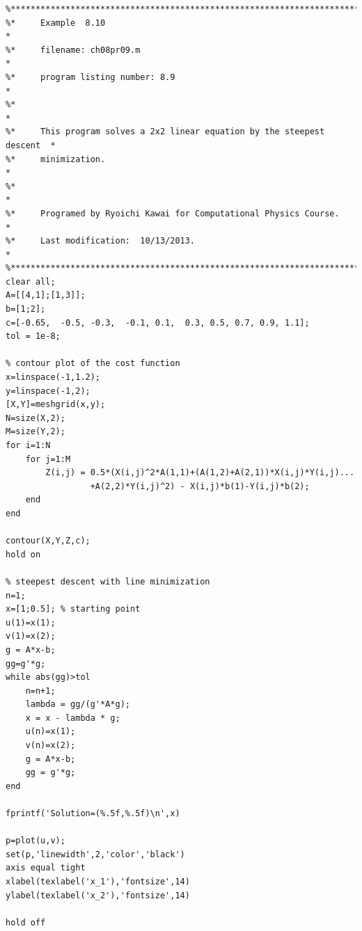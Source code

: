 
\bigskip
\noindent
\program
\label{prog:sd_min}
\footnotesize
\begin{verbatim}
%**************************************************************************
%*     Example  8.10                                                      *
%*     filename: ch08pr09.m                                               *
%*     program listing number: 8.9                                        *
%*                                                                        *
%*     This program solves a 2x2 linear equation by the steepest descent  *
%*     minimization.                                                      *
%*                                                                        *
%*     Programed by Ryoichi Kawai for Computational Physics Course.       *
%*     Last modification:  10/13/2013.                                    *
%**************************************************************************
clear all;
A=[[4,1];[1,3]];
b=[1;2];
c=[-0.65,  -0.5, -0.3,  -0.1, 0.1,  0.3, 0.5, 0.7, 0.9, 1.1];
tol = 1e-8;

% contour plot of the cost function
x=linspace(-1,1.2);
y=linspace(-1,2);
[X,Y]=meshgrid(x,y);
N=size(X,2);
M=size(Y,2);
for i=1:N
    for j=1:M
        Z(i,j) = 0.5*(X(i,j)^2*A(1,1)+(A(1,2)+A(2,1))*X(i,j)*Y(i,j)...
                 +A(2,2)*Y(i,j)^2) - X(i,j)*b(1)-Y(i,j)*b(2);
    end
end

contour(X,Y,Z,c);
hold on

% steepest descent with line minimization
n=1;
x=[1;0.5]; % starting point
u(1)=x(1);
v(1)=x(2);
g = A*x-b;
gg=g'*g;
while abs(gg)>tol
    n=n+1;
    lambda = gg/(g'*A*g);
    x = x - lambda * g;
    u(n)=x(1);
    v(n)=x(2);
    g = A*x-b;
    gg = g'*g;
end

fprintf('Solution=(%.5f,%.5f)\n',x)

p=plot(u,v);
set(p,'linewidth',2,'color','black')
axis equal tight
xlabel(texlabel('x_1'),'fontsize',14)
ylabel(texlabel('x_2'),'fontsize',14)

hold off
\end{verbatim}
\normalsize



